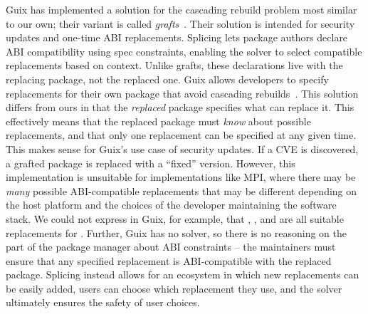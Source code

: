 Guix has implemented a solution for the cascading rebuild problem most similar to our
own; their variant is called {\it grafts}~\cite{guix-manual-grafts}. Their solution is
intended for security updates and one-time ABI replacements.
%
Splicing lets package authors declare ABI compatibility using spec constraints, enabling
the solver to select compatible replacements based on context. Unlike grafts, these
declarations live with the replacing package, not the replaced one.
Guix allows developers to specify replacements for their own package that avoid cascading
rebuilds~\cite{courtes2016timely, courtes2020grafts}. This
solution differs from ours in that the {\it replaced} package specifies what can replace
it. This effectively means that the replaced package must {\it know} about possible
replacements, and that only one replacement can be specified at any given time. This
makes sense for Guix's use case of security updates. If a CVE is discovered, a grafted
package is replaced with a ``fixed'' version. However, this implementation is unsuitable
for implementations like MPI, where there may be {\it many} possible ABI-compatible
replacements that may be different depending on the host platform and the choices of the
developer maintaining the software stack. We could not express in Guix, for example,
that , , and  are all suitable
replacements for . Further, Guix has no solver, so there is no reasoning
on the part of the package manager about ABI constraints -- the maintainers must ensure
that any specified replacement is ABI-compatible with the replaced package.
Splicing instead allows for
an ecosystem in which new replacements can be easily added, users can choose which
replacement they use, and the solver ultimately ensures the safety of user choices.
